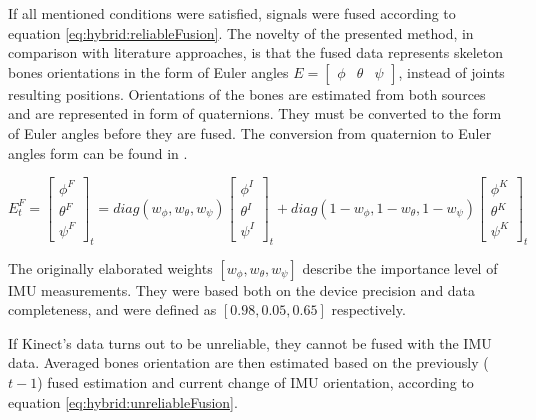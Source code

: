 \documentclass[sensors,article,submit,moreauthors,pdftex,10pt,a4paper]{mdpi}
\begin{document}
	If all mentioned conditions were satisfied, signals were fused according to equation \ref{eq:hybrid:reliableFusion}. The novelty of the presented method, in comparison with literature approaches, is that the fused data represents skeleton bones orientations in the form of Euler angles $E = \begin{bmatrix} \phi &  \theta & \psi \end{bmatrix}$, instead of joints resulting positions. Orientations of the bones are estimated from both sources and are represented in form of quaternions. They must be converted to the form of Euler angles before they are fused. The conversion from quaternion to Euler angles form can be found in \cite{Dunn2011}.
	
	\begin{equation} E^F_t = 
		\begin{bmatrix}  \phi^F \\  \theta^F \\  \psi^F \end{bmatrix}_t = 
		diag(w_\phi,w_\theta,w_\psi)
		\begin{bmatrix}  \phi^I \\  \theta^I \\  \psi^I \end{bmatrix}_t + 
		diag(1-w_\phi,1-w_\theta,1-w_\psi)
		\begin{bmatrix}  \phi^K \\  \theta^K \\  \psi^K \end{bmatrix}_t
		\label{eq:hybrid:reliableFusion}
	\end{equation}
	
	The originally elaborated weights $[w_\phi , w_\theta , w_\psi]$ describe the importance level of IMU measurements. They were based both on the device precision and data completeness, and were defined as $[0.98, 0.05, 0.65]$ respectively. 
	
	If Kinect’s data turns out to be unreliable, they cannot be fused with the IMU data. Averaged bones orientation are then estimated based on the previously ($t-1$) fused estimation and current change of IMU orientation, according to equation \ref{eq:hybrid:unreliableFusion}.
	
\end{document}
